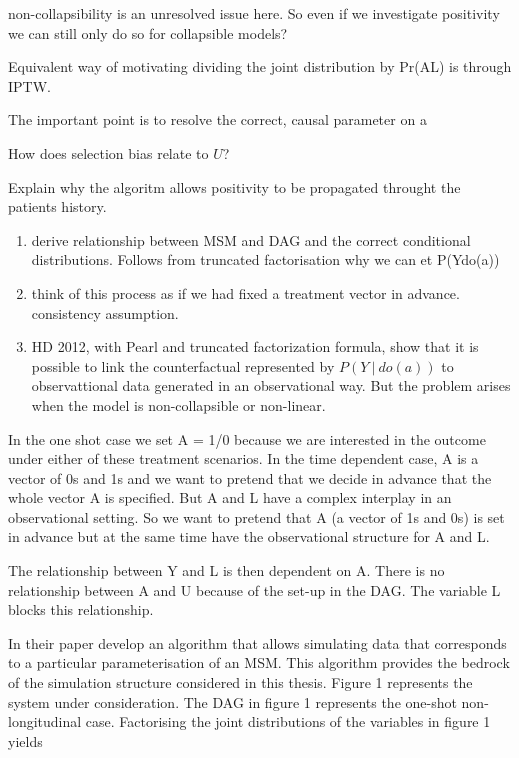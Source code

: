 \documentclass[11pt]{article}
\begin{document}
non-collapsibility is an unresolved issue here. So even if we
investigate positivity we can still only do so for collapsible models?

Equivalent way of motivating dividing the joint distribution by
Pr(A\textbar{}L) is through IPTW.

The important point is to resolve the correct, causal parameter on a

How does selection bias relate to \(U\)?

Explain why the algoritm allows positivity to be propagated throught the
patients history.

\begin{enumerate}
\def\labelenumi{\arabic{enumi}.}
\item
  derive relationship between MSM and DAG and the correct conditional
  distributions. Follows from truncated factorisation why we can et
  P(Y\textbar{}do(a))
\item
  think of this process as if we had fixed a treatment vector in
  advance. consistency assumption.
\item
  HD 2012, with Pearl and truncated factorization formula, show that it
  is possible to link the counterfactual represented by
  \(P(Y\ |\ do(a))\) to observattional data generated in an
  observational way. But the problem arises when the model is
  non-collapsible or non-linear.
\end{enumerate}

In the one shot case we set A = 1/0 because we are interested in the
outcome under either of these treatment scenarios. In the time dependent
case, A is a vector of 0s and 1s and we want to pretend that we decide
in advance that the whole vector A is specified. But A and L have a
complex interplay in an observational setting. So we want to pretend
that A (a vector of 1s and 0s) is set in advance but at the same time
have the observational structure for A and L.

The relationship between Y and L is then dependent on A. There is no
relationship between A and U because of the set-up in the DAG. The
variable L blocks this relationship.

In their paper \citet{Havercroft2012} develop an algorithm that allows
simulating data that corresponds to a particular parameterisation of an
MSM. This algorithm provides the bedrock of the simulation structure
considered in this thesis. Figure 1 represents the system under
consideration. The DAG in figure 1 represents the one-shot
non-longitudinal case. Factorising the joint distributions of the
variables in figure 1 yields
\end{document}
